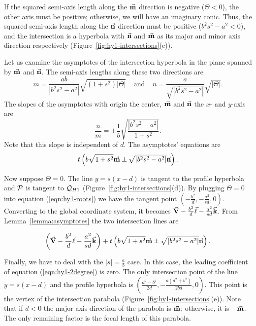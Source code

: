      If the squared semi-axis length along the $\vec{\bf m}$ direction is
negative ($\Theta<0$), the other axis must be positive; otherwise, we will
have an imaginary conic.  Thus, the squared semi-axis length along the
$\vec{\bf n}$ direction must be positive ($b^2s^2-a^2<0$), and
the intersection is a
hyperbola with $\vec{\bf n}$ and $\vec{\bf m}$ as its major and minor axis
direction respectively (Figure~\ref{fig:hy1-intersections}(c)).

     Let us examine the asymptotes of the intersection hyperbola in the plane
spanned by $\vec{\bf m}$ and $\vec{\bf n}$.
The semi-axis lengths along
these two directions are
\[ m=\frac{ab}{|b^2s^2-a^2|}\sqrt{(1+s^2)|\Theta|}\ \ \ \ \ \mbox{and}\ \ \ \ \
   n=\frac{a}{\sqrt{|b^2s^2-a^2|}}\sqrt{|\Theta|}. \]
The slopes of the asymptotes with origin the center, $\vec{\bf m}$
and $\vec{\bf n}$ the $x$- and $y$-axis are
\[   \frac{n}{m} = \pm \frac{1}{b}\sqrt{\frac{|b^2s^2-a^2|}{1+s^2}}. \]
Note that this slope is independent of $d$.  The asymptotes' equations are
\[ t\left(b\sqrt{1+s^2}\vec{\bf m}\pm\sqrt{|b^2s^2-a^2|}\vec{\bf n}\right). \]

     Now suppose $\Theta=0$.  The line $y=s(x-d)$ is tangent to the profile
hyperbola and  ${\cal P}$ is tangent to ${\cal Q}_{H1}$
(Figure~\ref{fig:hy1-intersections}(d)).  By plugging $\Theta=0$ into equation
(\ref{eqn:hy1-roots}) we have the tangent point
$\left(-\frac{b^2}{d},-\frac{a^2}{sd},0\right)$.  Converting to the global
coordinate system, it becomes $\vec{\bf V}-\frac{b^2}{d}\vec{\bf \ell}-
\frac{a^2}{sd}\vec{\bf k}$.  From Lemma~\ref{lemma:asymptotes} the two
intersection lines are

\[ \left(\vec{\bf V}-\frac{b^2}{d}\vec{\bf \ell}-\frac{a^2}{sd}\vec{\bf k}\right)
     +t\left(b\sqrt{1+s^2}\vec{\bf m}\pm\sqrt{|b^2s^2-a^2|}\vec{\bf n}\right). \]

     Finally, we have to deal with the $|s|=\frac{a}{b}$ case.  In this case,
the leading coefficient of equation (\ref{eqn:hy1-2degree}) is zero.  The
only intersection point of the line $y=s(x-d)$ and the profile hyperbola is
$\left(\frac{d^2-b^2}{2d},-\frac{a(d^2+b^2)}{2bd},0\right)$.  This point is the
vertex of the intersection parabola (Figure~\ref{fig:hy1-intersections}(e)).
Note that if $d<0$ the major axis direction of the parabola is $\vec{\bf m}$;
otherwise, it is $-\vec{\bf m}$.  The only remaining factor is the focal length
of this parabola.

